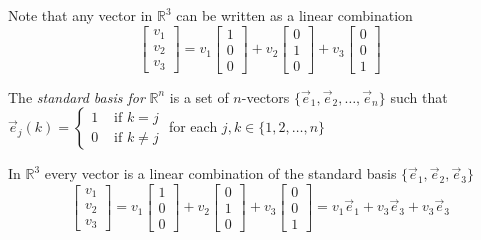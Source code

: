 \begin{example}
Note that any vector in $\mathbb{R}^3$ can be written as a linear combination
\[
\begin{bmatrix}v_1 \\ v_2 \\ v_3\end{bmatrix}=
v_1 \begin{bmatrix}1 \\ 0 \\ 0\end{bmatrix}+
v_2 \begin{bmatrix}0 \\ 1 \\ 0\end{bmatrix}+
v_3 \begin{bmatrix}0 \\ 0 \\ 1\end{bmatrix}
\]
\end{example}

\begin{definition}
The \emph{standard basis for} $\mathbb{R}^n$ is a set of $n$-vectors 
$\{\vec{e}_1, \vec{e}_2, \ldots, \vec{e}_n\}$ such that
$\vec{e}_j(k)=\begin{cases}
1 & \text{ if } k=j\\
0 & \text{ if } k\neq j
\end{cases}$ 
for each $j,k \in \{1, 2, \ldots, n\}$
\end{definition}

\begin{example}
In $\mathbb{R}^3 $ every vector is a linear combination of the standard basis 
$\{\vec{e}_1,\vec{e}_2,\vec{e}_3\}$
\[
\begin{bmatrix}v_1 \\ v_2 \\ v_3\end{bmatrix}=
v_1 \begin{bmatrix}1 \\ 0 \\ 0\end{bmatrix}+
v_2 \begin{bmatrix}0 \\ 1 \\ 0\end{bmatrix}+
v_3 \begin{bmatrix}0 \\ 0 \\ 1\end{bmatrix}
=v_1\vec{e}_1+v_3\vec{e}_3+v_3\vec{e}_3
\]
\end{example}

